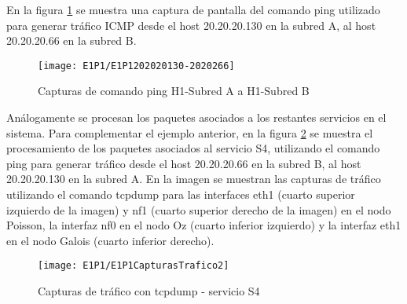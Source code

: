 En la figura \ref{fig:LabE1P1CapHost} se muestra una captura de pantalla del comando ping utilizado para generar tr\'afico ICMP desde el host 20.20.20.130 en la subred A, al host 20.20.20.66 en la subred B.\\

\begin{figure}[h!] 
\centering    
\texttt{[image: E1P1/E1P1202020130-2020266]}
\caption[Capturas de comando ping H1-Subred A]{Capturas de comando ping H1-Subred A a H1-Subred B}
\label{fig:LabE1P1CapHost}
\end{figure}

Análogamente se procesan los paquetes asociados a los restantes servicios en el sistema. Para complementar el ejemplo anterior, en la figura \ref{fig:LabE1P1CapsTraf2} se muestra el procesamiento de los paquetes asociados al servicio S4, utilizando el comando ping para generar tr\'afico desde el host 20.20.20.66 en la subred B, al host 20.20.20.130 en la subred A. En la imagen se muestran las capturas de tr\'afico utilizando el comando tcpdump para las interfaces eth1 (cuarto superior izquierdo de la imagen) y nf1 (cuarto superior derecho de la imagen) en el nodo Poisson, la interfaz nf0 en el nodo Oz (cuarto inferior izquierdo) y la interfaz eth1 en el nodo Galois (cuarto inferior derecho).\\


\begin{figure}[h!] 
\centering    
\texttt{[image: E1P1/E1P1CapturasTrafico2]}
\caption[Capturas de tr\'afico con tcpdump - servicio S4]{Capturas de tr\'afico con tcpdump - servicio S4}
\label{fig:LabE1P1CapsTraf2}
\end{figure}



